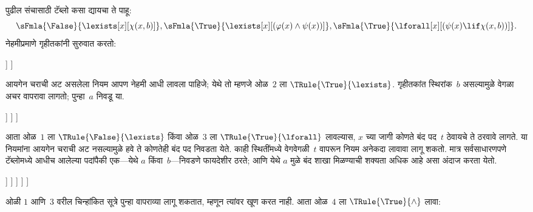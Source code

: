 \begin{ex}
पुढील संचासाठी टॅब्लो कसा द्यायचा ते पाहू:
\[\sFmla{\False}{\lexists[x][\chi(x,b)]},
\sFmla{\True}{\lexists[x][(\varphi(x) \land \psi(x))]},
\sFmla{\True}{\lforall[x][(\psi(x) \lif \chi(x,b))]}.
\]
नेहमीप्रमाणे गृहीतकांनी सुरुवात करतो:
\begin{oltableau}
  [\sFmla{\False}{\lexists[x][\formula{C}(x,b)]}, just=\TAss
    [\sFmla{\True}{\lexists[x][(\varphi(x) \land \psi(x))]},
      just=\TAss
      [\sFmla{\True}{\lforall[x][(\psi(x) \lif \formula{C}(x,b))]},
        just=\TAss]
    ]
  ]
\end{oltableau}
आयगेन चराची अट असलेला नियम आपण नेहमी आधी लावला पाहिजे; येथे तो म्हणजे
ओळ~$2$ ला $\TRule{\True}{\lexists}$. गृहीतकांत स्थिरांक~$b$ असल्यामुळे
वेगळा अचर वापरावा लागतो; पुन्हा~$a$ निवडू या.
\begin{oltableau}
  [\sFmla{\False}{\lexists[x][\formula{C}(x,b)]}, just=\TAss
    [\sFmla{\True}{\lexists[x][(\varphi(x) \land \psi(x))]},
      just=\TAss, checked
      [\sFmla{\True}{\lforall[x][(\psi(x) \lif \formula{C}(x,b))]},
        just=\TAss
        [\sFmla{\True}{\varphi(a) \land \psi(a)},
          just={\TRule{\True}{\lexists}[2]}]
      ]
    ]
  ]
\end{oltableau}
आता ओळ~$1$ ला $\TRule{\False}{\lexists}$ किंवा ओळ~$3$ ला
$\TRule{\True}{\lforall}$ लावल्यास, $x$ च्या जागी कोणते बंद पद~$t$ ठेवायचे
ते ठरवावे लागते. या नियमांना आयगेन चराची अट नसल्यामुळे हवे ते कोणतेही बंद
पद निवडता येते. काही स्थितींमध्ये वेगवेगळी~$t$ वापरून नियम अनेकदा लावावा
लागू शकतो. मात्र सर्वसाधारणपणे टॅब्लोमध्ये आधीच आलेल्या पदांपैकी
एक---येथे $a$ किंवा~$b$---निवडणे फायदेशीर ठरते; आणि येथे $a$ मुळे बंद
शाखा मिळण्याची शक्यता अधिक आहे असा अंदाज करता येतो.
\begin{oltableau}
  [\sFmla{\False}{\lexists[x][\formula{C}(x,b)]}, just=\TAss
    [\sFmla{\True}{\lexists[x][(\varphi(x) \land \psi(x))]},
      just=\TAss, checked
      [\sFmla{\True}{\lforall[x][(\psi(x) \lif \formula{C}(x,b))]}, just=\TAss
        [\sFmla{\True}{\varphi(a) \land \psi(a)}, just={\TRule{\True}{\lexists}[2]}
          [\sFmla{\False}{\formula{C}(a,b)}, just={\TRule{\False}{\lexists}[1]}
            [\sFmla{\True}{\psi(a) \lif \formula{C}(a,b)},
              just={\TRule{\True}{\lforall}[3]}
            ]
          ]
        ]
      ]
    ]
  ]
\end{oltableau}
ओळी $1$ आणि~$3$ वरील चिन्हांकित सूत्रे पुन्हा वापराव्या लागू शकतात,
म्हणून त्यांवर खूण करत नाही. आता ओळ~$4$ ला $\TRule{\True}{\land}$ लावा:
\begin{oltableau}

\end{oltableau}
\end{ex}
